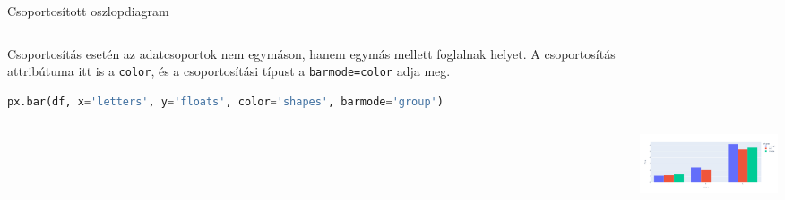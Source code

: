 \documentclass[english, aspectratio=169]{beamer}
\begin{document}
\begin{frame}[fragile]{Csoportosított oszlopdiagram}
	\begin{columns}
		\begin{column}{.5\textwidth}
			Csoportosítás esetén az adatcsoportok nem egymáson, hanem egymás mellett foglalnak helyet. A csoportosítás attribútuma itt is a \texttt{color}, és a csoportosítási típust a \texttt{barmode=color} adja meg. 
			\vspace{0.3cm}
			\begin{lstlisting}[language=python]
px.bar(df, x='letters', y='floats', color='shapes', barmode='group')
			\end{lstlisting}
		\end{column}
		\begin{column}{.5\textwidth}
			\begin{center}
				\includegraphics[width=7cm, height=7cm, keepaspectratio]{images/plots_12.png}
			\end{center}			
		\end{column}
	\end{columns}
\end{frame}
\end{document}
